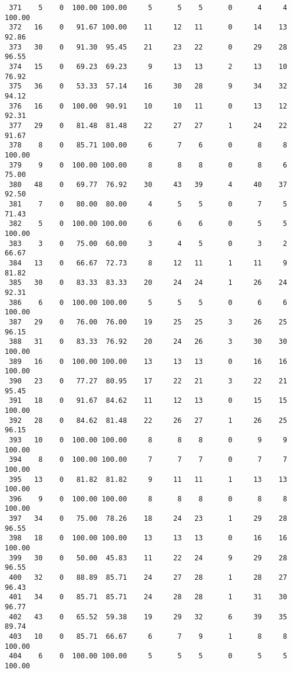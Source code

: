 \begin{verbatim}
 371    5    0  100.00 100.00     5      5    5      0      4     4   100.00
 372   16    0   91.67 100.00    11     12   11      0     14    13    92.86
 373   30    0   91.30  95.45    21     23   22      0     29    28    96.55
 374   15    0   69.23  69.23     9     13   13      2     13    10    76.92
 375   36    0   53.33  57.14    16     30   28      9     34    32    94.12
 376   16    0  100.00  90.91    10     10   11      0     13    12    92.31
 377   29    0   81.48  81.48    22     27   27      1     24    22    91.67
 378    8    0   85.71 100.00     6      7    6      0      8     8   100.00
 379    9    0  100.00 100.00     8      8    8      0      8     6    75.00
 380   48    0   69.77  76.92    30     43   39      4     40    37    92.50
 381    7    0   80.00  80.00     4      5    5      0      7     5    71.43
 382    5    0  100.00 100.00     6      6    6      0      5     5   100.00
 383    3    0   75.00  60.00     3      4    5      0      3     2    66.67
 384   13    0   66.67  72.73     8     12   11      1     11     9    81.82
 385   30    0   83.33  83.33    20     24   24      1     26    24    92.31
 386    6    0  100.00 100.00     5      5    5      0      6     6   100.00
 387   29    0   76.00  76.00    19     25   25      3     26    25    96.15
 388   31    0   83.33  76.92    20     24   26      3     30    30   100.00
 389   16    0  100.00 100.00    13     13   13      0     16    16   100.00
 390   23    0   77.27  80.95    17     22   21      3     22    21    95.45
 391   18    0   91.67  84.62    11     12   13      0     15    15   100.00
 392   28    0   84.62  81.48    22     26   27      1     26    25    96.15
 393   10    0  100.00 100.00     8      8    8      0      9     9   100.00
 394    8    0  100.00 100.00     7      7    7      0      7     7   100.00
 395   13    0   81.82  81.82     9     11   11      1     13    13   100.00
 396    9    0  100.00 100.00     8      8    8      0      8     8   100.00
 397   34    0   75.00  78.26    18     24   23      1     29    28    96.55
 398   18    0  100.00 100.00    13     13   13      0     16    16   100.00
 399   30    0   50.00  45.83    11     22   24      9     29    28    96.55
 400   32    0   88.89  85.71    24     27   28      1     28    27    96.43
 401   34    0   85.71  85.71    24     28   28      1     31    30    96.77
 402   43    0   65.52  59.38    19     29   32      6     39    35    89.74
 403   10    0   85.71  66.67     6      7    9      1      8     8   100.00
 404    6    0  100.00 100.00     5      5    5      0      5     5   100.00

\end{verbatim}
